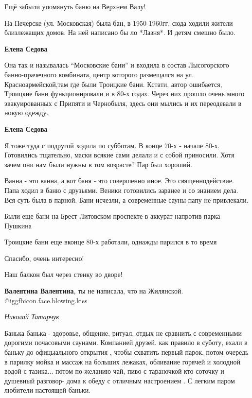 \begin{itemize}
Ещё забыли упомянуть баню на Верхнем Валу!


На Печерске (ул. Московская) была бан, в 1950-1960гг. сюда ходили жители
близлежащих домов. На ней написано бы ло *Лазня*. И детям смешно было.

\begin{itemize} %
\textbf{Елена Седова}

Она так и называлась \enquote{Московские бани} и входила в состав Лысогорского
банно-прачечного комбината, центр которого размещался на ул.
Красноармейской,там где были Троицкие бани. Кстати, автор ошибается, Троицкие
бани функционировали и в 80-х годах. Через них прошло очень много
эвакуированных с Припяти и Чернобыля, здесь они мылись и их переодевали в новую
одежду.


\textbf{Елена Седова} 

Я тоже туда с подругой ходила по субботам. В конце 70-х - начале 80-х.
Готовились тщательно, маски всякие сами делали и с собой приносили. Хотя зачем
они нам были нужны в том возрасте? Пар был хороший.

\end{itemize} %


Ванна - это ванна, а вот баня - это совершенно иное. Это священнодействие. Папа
ходил в баню с друзьями. Веники готовились заранее и со знанием дела. Вся суть
была в парной. Бани исчезли, а современные сауны папу не привлекали.

Были еще бани на Брест Литовском проспекте в аккурат напротив парка Пушкина

Троицкие бани еще вконце 80-х работали, однажды парился в то время

Спасибо, очень интересно!

Наш балкон был через стенку во дворе!

\begin{itemize} %
\textbf{Валентина Валентина}, ты не написала, что на Жилянской. @igg{fbicon.face.blowing.kiss} 
\end{itemize} %

\emph{Николай Татарчук}

Банька банька - здоровье, общение, ритуал, отдых не сравнить с современными дорогими почасовыми саунами. Компанией друзей. как правило в суботу, ехали в баньку до офицыального открытия , чтобы схватить первый парок, потом очередь в парилку мойка и массаж на больших лежаках, обливание горячей и холодной водой с тазика... потом по желанию чай, пиво с тараночкой кто соточку и душевный разговор- дома к обеду с отличным настроением . С легким паром любители настоящей баньки.


\end{itemize} %
